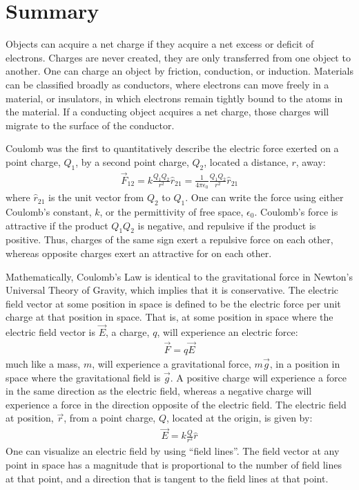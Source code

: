 \section{Summary}
\begin{chapterSummary}
Objects can acquire a net charge if they acquire a net excess or deficit of electrons. Charges are never created, they are only transferred from one object to another. One can charge an object by friction, conduction, or induction. Materials can be classified broadly as conductors, where electrons can move freely in a material, or insulators, in which electrons remain tightly bound to the atoms in the material. If a conducting object acquires a net charge, those charges will migrate to the surface of the conductor.

Coulomb was the first to quantitatively describe the electric force exerted on a point charge, $Q_1$, by a second point charge, $Q_2$, located a distance, $r$, away:
\begin{align*}
\vec F_{12}=k\frac{Q_1Q_2}{r^2}\hat r_{21}=\frac{1}{4\pi\epsilon_0}\frac{Q_1Q_2}{r^2}\hat r_{21}
\end{align*}
where $\hat r_{21}$ is the unit vector from  $Q_2$ to $Q_1$. One can write the force using either Coulomb's constant, $k$, or the permittivity of free space, $\epsilon_0$. Coulomb's force is attractive if the product $Q_1Q_2$ is negative, and repulsive if the product is positive. Thus, charges of the same sign exert a repulsive force on each other, whereas opposite charges exert an attractive for on each other. 

Mathematically, Coulomb's Law is identical to the gravitational force in Newton's Universal Theory of Gravity, which implies that it is conservative. The electric field vector at some position in space is defined to be the electric force per unit charge at that position in space. That is, at some position in space where the electric field vector is $\vec E$, a charge, $q$, will experience an electric force:
\begin{align*}
\vec F=q\vec E
\end{align*} 
much like a mass, $m$, will experience a gravitational force, $m\vec g$, in a position in space where the gravitational field is $\vec g$. A positive charge will experience a force in the same direction as the electric field, whereas a negative charge will experience a force in the direction opposite of the electric field. The electric field at position, $\vec r$, from a point charge, $Q$, located at the origin, is given by:
\begin{align*}
\vec E = k\frac{Q}{r^2}\hat r
\end{align*}
One can visualize an electric field by using ``field lines''. The field vector at any point in space has a magnitude that is proportional to the number of field lines at that point, and a direction that is tangent to the field lines at that point.


\end{chapterSummary}
